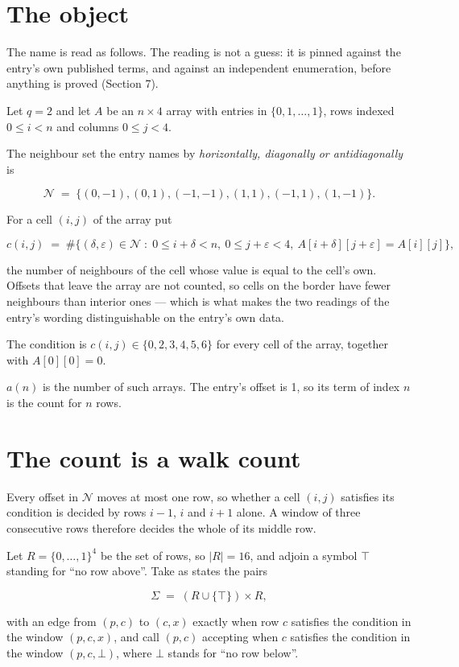 \documentclass[11pt]{article}
\theoremstyle{definition}
\begin{document}
\section{The object}

The name is read as follows. The reading is not a guess: it is pinned against the entry's own published terms, and against an independent enumeration, before anything is proved (Section 7).

Let $q = 2$ and let $A$ be an $n \times 4$ array with entries in $\{0,1,\dots,1\}$, rows indexed $0 \le i < n$ and columns $0 \le j < 4$.

The neighbour set the entry names by {\itshape horizontally, diagonally or antidiagonally} is

\[\mathcal{N} \;=\; \{(0,-1), (0,1), (-1,-1), (1,1), (-1,1), (1,-1)\}.\]

For a cell $(i,j)$ of the array put

\[c(i,j) \;=\; \#\bigl\{(\delta,\varepsilon)\in\mathcal{N} \;:\; 0\le i+\delta<n,\ 0\le j+\varepsilon<4,\ A[i+\delta][j+\varepsilon] = A[i][j]\bigr\},\]

the number of neighbours of the cell whose value is equal to the cell's own. Offsets that leave the array are not counted, so cells on the border have fewer neighbours than interior ones --- which is what makes the two readings of the entry's wording distinguishable on the entry's own data.

The condition is $c(i,j) \in \{0, 2, 3, 4, 5, 6\}$ for every cell of the array, together with $A[0][0]=0$.

$a(n)$ is the number of such arrays. The entry's offset is 1, so its term of index $n$ is the count for $n$ rows.

\section{The count is a walk count}

Every offset in $\mathcal{N}$ moves at most one row, so whether a cell $(i,j)$ satisfies its condition is decided by rows $i-1$, $i$ and $i+1$ alone. A window of three consecutive rows therefore decides the whole of its middle row.

Let $R = \{0,\dots,1\}^{4}$ be the set of rows, so $|R| = 16$, and adjoin a symbol $\top$ standing for ``no row above''. Take as states the pairs

\[\Sigma \;=\; (R \cup \{\top\}) \times R,\]

with an edge from $(p,c)$ to $(c,x)$ exactly when row $c$ satisfies the condition in the window $(p,c,x)$, and call $(p,c)$ accepting when $c$ satisfies the condition in the window $(p,c,\bot)$, where $\bot$ stands for ``no row below''.
\end{document}
